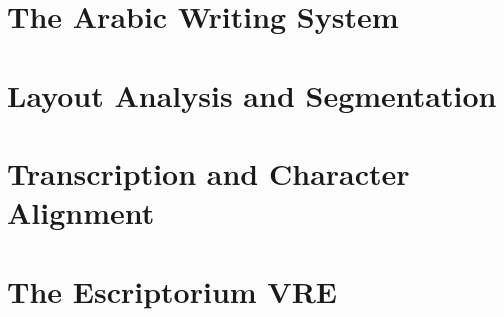 \part{The Arabic Writing System}



\part{Layout Analysis and Segmentation}

\part{Transcription and Character Alignment}

\part{The Escriptorium VRE}

